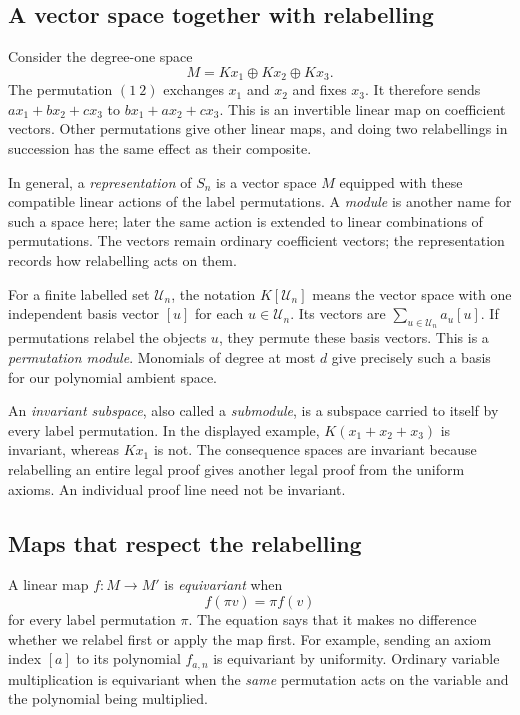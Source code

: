 \documentclass[11pt,a4paper,oneside,openany]{book}
\theoremstyle{definition}\newtheorem{definition}[theorem]{Definition}
\theoremstyle{remark}\newtheorem{remark}[theorem]{Remark}
\numberwithin{equation}{chapter}
\begin{document}
\subsection{A vector space together with relabelling}
Consider the degree-one space
\[
                  M=Kx_1\oplus Kx_2\oplus Kx_3.
\]
The permutation $(1\ 2)$ exchanges $x_1$ and $x_2$ and fixes $x_3$.
It therefore sends
$a x_1+b x_2+c x_3$ to $b x_1+a x_2+c x_3$.
This is an invertible linear map on coefficient vectors. Other
permutations give other linear maps, and doing two relabellings in
succession has the same effect as their composite.

In general, a \emph{representation} of $S_n$ is a vector space $M$
equipped with these compatible linear actions of the label
permutations. A \emph{module} is another name for such a space here;
later the same action is extended to linear combinations of permutations.
The vectors remain ordinary coefficient vectors; the representation
records how relabelling acts on them.

For a finite labelled set $\mathcal U_n$, the notation $K[\mathcal U_n]$
means the vector space with one independent basis vector $[u]$ for
each $u\in\mathcal U_n$. Its vectors are
$\sum_{u\in\mathcal U_n}a_u[u]$. If permutations relabel the objects
$u$, they permute these basis vectors. This is a \emph{permutation
module}. Monomials of degree at most $d$ give precisely such a basis
for our polynomial ambient space.

An \emph{invariant subspace}, also called a \emph{submodule}, is a
subspace carried to itself by every label permutation. In the displayed
example, $K(x_1+x_2+x_3)$ is invariant, whereas $Kx_1$ is not.
The consequence spaces are invariant because relabelling an entire
legal proof gives another legal proof from the uniform axioms.
An individual proof line need not be invariant.

\subsection{Maps that respect the relabelling}
A linear map $f:M\to M'$ is \emph{equivariant} when
\[
                         f(\pi v)=\pi f(v)
\]
for every label permutation $\pi$. The equation says that it makes
no difference whether we relabel first or apply the map first.
For example, sending an axiom index $[a]$ to its polynomial $f_{a,n}$
is equivariant by uniformity. Ordinary variable multiplication is
equivariant when the \emph{same} permutation acts on the variable
and the polynomial being multiplied.
\end{document}
